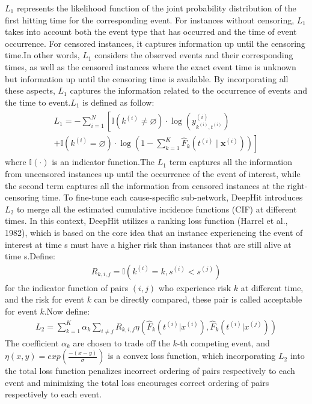 \documentclass[conference]{IEEEconf}
\begin{document}
$L_{1}$ represents the likelihood function of the joint probability distribution of the first hitting time for the corresponding event. For instances without censoring, $L_{1}$ takes into account both the event type that has occurred and the time of event occurrence. For censored instances, it captures information up until the censoring time.In other words, $L_{1}$ considers the observed events and their corresponding times, as well as the censored instances where the exact event time is unknown but information up until the censoring time is available. By incorporating all these aspects, $L_{1}$ captures the information related to the occurrence of events and the time to event.$L_{1}$ is defined as follow:
\begin{eqnarray}
	\begin{aligned}
	L_{1}=-\sum_{i=1}^{N}\left[\mathbb{I}\left(k^{(i)} \neq \varnothing\right) \cdot \log \left(y_{k^{(i)}, t^{(i)}}^{(i)}\right)\right. \\
	\left.+\mathbb{I}\left(k^{(i)}=\varnothing\right) \cdot \log \left(1-\sum_{k=1}^{K} \hat{F}_{k}\left(t^{(i)} \mid \mathbf{x}^{(i)}\right)\right)\right]
\end{aligned}
\end{eqnarray}
where $\mathbb{I}(\cdot)$ is an indicator function.The $L_{1}$ term captures all the information from uncensored instances up until the occurrence of the event of interest, while the second term captures all the information from censored instances at the right-censoring time. To fine-tune each cause-specific sub-network, DeepHit introduces $L_{2}$ to merge all the estimated cumulative incidence functions (CIF) at different times. In this context, DeepHit utilizes a ranking loss function (Harrel et al., 1982), which is based on the core idea that an instance experiencing the event of interest at time s must have a higher risk than instances that are still alive at time s.Define:
\begin{eqnarray}
	R_{k,i,j}=\mathbb{I}(k^{(i)}=k,s^{(i)}<s^{(j)}) 
\end{eqnarray}
for the indicator function of pairs $(i,j)$ who experience risk $k$ at different time, and the risk for event $k$ can be directly compared, these pair is called acceptable for event $k$.Now define:
\begin{eqnarray}
	L_{2}=\sum_{k=1}^{K}\alpha_{k}\sum_{i \ne j}^{}R_{k,i,j}\eta\left(\hat{F}_{k}(t^{(i)}|x^{(i)}),\hat{F}_{k}(t^{(i)}|x^{(j)})\right)
\end{eqnarray}
The coefficient $\alpha_{k}$ are chosen to trade off the $k$-th competing event, and $\eta(x,y)=exp(\frac{-(x-y)}{\sigma})$ is a convex loss function, which incorporating $L_{2}$ into the total loss function penalizes incorrect ordering of pairs respectively to each event and minimizing the total loss encourages correct ordering of pairs respectively to each event. 
\end{document}
